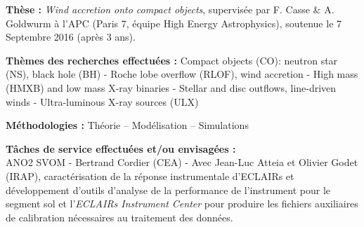 \documentclass[11pt]{article}
\begin{document}
\vspace{-0.2cm}
{\bf Th\`ese :} \textit{Wind accretion onto compact objects}, supervis\'ee par F. Casse \& A. Goldwurm \`{a} l'APC (Paris 7, \'{e}quipe High Energy Astrophysics), soutenue le 7 Septembre 2016 (apr\`es 3 ans). 



\vspace{0.2cm}
{\bf Th\`emes des recherches effectu\'ees : } Compact objects (CO): neutron star (NS), black hole (BH) - Roche lobe overflow (RLOF), wind accretion - High mass (HMXB) and low mass X-ray binaries - Stellar and disc outflows, line-driven winds - Ultra-luminous X-ray sources (ULX)


\vspace{0.3cm}


{\bf M\'ethodologies :}  
Th\'eorie --  Mod\'elisation -- Simulations

\vspace{0.3cm}

{\bf T\^{a}ches de service effectu\'ees et/ou envisag\'ees :}\\
ANO2 SVOM - Bertrand Cordier (CEA) - Avec Jean-Luc Atteia et Olivier Godet (IRAP), caract\'{e}risation de la r\'{e}ponse instrumentale d'ECLAIRs et d\'{e}veloppement d'outils d'analyse de la performance de l'instrument pour le segment sol et l'\textit{ECLAIRs Instrument Center} pour produire les fichiers auxiliaires de calibration n\'{e}cessaires au traitement des donn\'{e}es.\\
\end{document}
